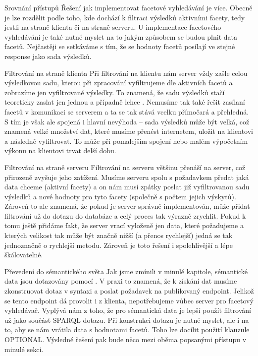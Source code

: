 \sec Srovnání přístupů
Řešení jak implementovat facetové vyhledávání je více. 
Obecně je lze rozdělit podle toho, kde dochází k filtraci výsledků aktivními facety, tedy jestli na straně klienta či na straně serveru.
U implementace facetového vyhledávání je také nutné myslet na to jakým způsobem se budou plnit data facetů. Nejčastěji se setkáváme s tím, že se
hodnoty facetů posílají ve stejné response jako sada výsledků. 

  \secc Filtrování na straně klienta
  Při filtrování na klientu nám server vždy zašle celou výsledkovou sadu, kterou při zpracování vyfiltrujeme dle aktivních facetů a zobrazíme jen vyfiltrované výsledky.
  To znamená, že sadu výsledků stačí teoreticky zaslat jen jednou a případně lehce .
  Nemusíme tak také řešit zasílaní facetů v komunikaci se serverem a ta se tak stává vcelku přímočará a přehledná.
  S tím je však ale spojená i hlavní nevýhoda – sada výsledků může být velká, což znamená velké množství dat, které musíme přenést internetem, uložit na klientovi a následně vyfiltrovat.
  To může při pomalejším spojení nebo malém výpočetním výkonu na klientovi trvat delší dobu. 

  \secc Filtrování na straně serveru
  Filtrování na serveru většinu  přenáší na server, což přirozeně zvyšuje jeho zatížení.
  Musíme serveru spolu s požadavkem předat jaká data chceme (aktivní facety) a on nám musí zpátky poslat již vyfiltrovanou sadu výsledků a nové hodnoty pro tyto facety (společně s počtem jejich výskytů).
  Zároveň to ale znamená, že pokud je server správně implementován, může přidat filtrování už do dotazu do databáze a celý proces tak výrazně zrychlit.
  Pokud k tomu ještě přidáme fakt, že server vrací vyloženě jen data, které požadujeme a kterých velikost tak může být značně nižší (a přenos rychlejší) jedná se tak jednoznačně o rychlejší metodu.
  Zároveň je toto řešení i spolehlivější a lépe škálovatelné.
	
\sec Převedení do sémantického světa
Jak jsme zmínili v minulé kapitole, sémantické data jsou dotazovány pomocí . 
V praxi to znamená, že k získání dat musíme zkonstruovat dotaz v syntaxi  a poslat požadavek na publikovaný  endpoint.
Jelikož se tento endpoint dá provolit i z klienta, nepotřebujeme vůbec server pro facetový vyhledávač.
Vyplývá nám z toho, že pro sémantická data je lepší použít filtrování už jako součást SPARQL dotazu.
Při konstrukci dotazu je nutné myslet, ale i na to, aby se nám vrátila data s hodnotami facetů. 
Toho lze docílit použití klauzule OPTIONAL.
Výsledné řešení pak bude něco mezi oběma popsanými přístupu v minulé sekci.
